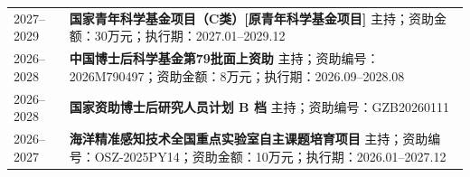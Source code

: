 \begin{longtable}{@{}p{}p{}@{}}
2027--2029 & \textbf{国家青年科学基金项目（C类）[原青年科学基金项目]}\newline
             主持；资助金额：30万元；执行期：2027.01--2029.12 \\[0.5em]
2026--2028 & \textbf{中国博士后科学基金第79批面上资助}\newline
       主持；资助编号：2026M790497；资助金额：8万元；执行期：2026.09--2028.08 \\[0.5em]
2026--2028 & \textbf{国家资助博士后研究人员计划 B 档}\newline
       主持；资助编号：GZB20260111 \\[0.5em]
2026--2027 & \textbf{海洋精准感知技术全国重点实验室自主课题培育项目}\newline
       主持；资助编号：OSZ-2025PY14；资助金额：10万元；执行期：2026.01--2027.12 \\
\end{longtable}
